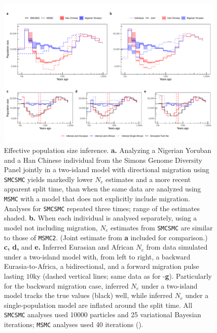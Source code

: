 \begin{figure}
	\centering
	\includegraphics[width=\textwidth]{plot/new_ne_figure.pdf}
	\caption[Effective Population Size Inference]{Effective population size inference. {\bf a.} Analyzing a Nigerian Yoruban and a Han Chinese individual from the Simons Genome Diversity Panel jointly in a two-island model with directional migration using {\tt SMCSMC} yields markedly lower $N_e$ estimates and a more recent apparent split time, than when the same data are analyzed using {\tt MSMC} with a model that does not explicitly include migration. Analyses for {\tt SMCSMC} repeated three times; range of the estimates shaded. {\bf b.} When each individual is analysed separately, using a model not including migration, $N_e$ estimates from {\tt SMCSMC} are similar to those of {\tt MSMC2}. (Joint estimate from {\bf a} included for comparison.) {\bf c, d,} and {\bf e.} 
	Inferred Eurasian and African $N_e$ from data simulated under a two-island model with, from left to right, a backward Eurasia-to-Africa, a bidirectional, and a forward  migration pulse lasting $10$ky (dashed vertical lines; same data as for  -{\bf g}).  Particularly for the backward migration case, inferred $N_e$ under a two-island model tracks the true values (black) well, while inferred $N_e$ under a single-population model are inflated around the split time.
 All {\tt SMCSMC} analyses used 10000 particles and 25 variational Bayesian iterations; {\tt MSMC} analyses used 40 iterations ().}
\label{fig:neplot}
\end{figure}

